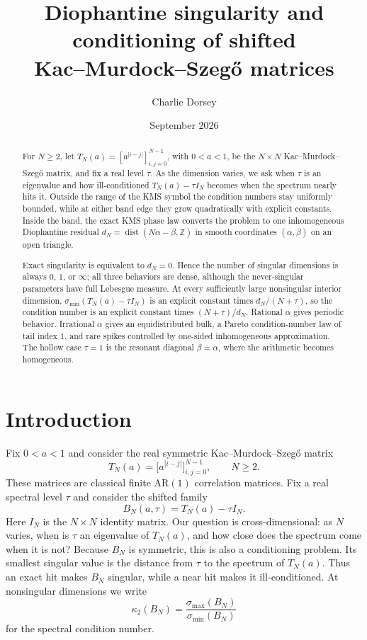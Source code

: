 \documentclass[11pt,reqno]{amsart}
\title[Diophantine singularity of shifted KMS matrices]
{Diophantine singularity and conditioning of shifted\\
Kac--Murdock--Szeg\H{o} matrices}
\author{Charlie Dorsey}
\date{September 2026}
\theoremstyle{plain}
\theoremstyle{definition}
\begin{document}
\begin{abstract}
For $N\ge2$, let $T_N(a)=[a^{|i-j|}]_{i,j=0}^{N-1}$, with $0<a<1$, be the
$N\times N$ Kac--Murdock--Szeg\H{o} matrix, and fix a real level $\tau$.
As the dimension varies, we ask when $\tau$ is an eigenvalue and how ill-conditioned
$T_N(a)-\tau I_N$ becomes when the spectrum nearly hits it.  Outside the range of
the KMS symbol the condition numbers stay uniformly bounded, while at either band
edge they grow quadratically with explicit constants.  Inside the band, the exact
KMS phase law converts the problem to one inhomogeneous Diophantine residual
$d_N=\operatorname{dist}(N\alpha-\beta,\mathbb Z)$ in smooth coordinates
$(\alpha,\beta)$ on an open triangle.

Exact singularity is equivalent to $d_N=0$.  Hence the number of singular
dimensions is always $0$, $1$, or $\infty$; all three behaviors are dense, although
the never-singular parameters have full Lebesgue measure.  At every sufficiently
large nonsingular interior dimension,
$\sigma_{\min}(T_N(a)-\tau I_N)$ is an explicit constant times $d_N/(N+\tau)$,
so the condition number is an explicit constant times $(N+\tau)/d_N$.
Rational $\alpha$ gives periodic behavior.  Irrational $\alpha$ gives an
equidistributed bulk, a Pareto condition-number law of tail index $1$, and rare
spikes controlled by one-sided inhomogeneous approximation.  The hollow case
$\tau=1$ is the resonant diagonal $\beta=\alpha$, where the arithmetic becomes
homogeneous.
\end{abstract}

\maketitle

\section{Introduction}\label{sec:intro}

Fix $0<a<1$ and consider the real symmetric Kac--Murdock--Szeg\H{o} matrix
\begin{equation}\label{eq:Tdef}
T_N(a)=\bigl[a^{|i-j|}\bigr]_{i,j=0}^{N-1},\qquad N\ge2.
\end{equation}
These matrices are classical finite AR$(1)$ correlation matrices.  Fix a real
spectral level $\tau$ and consider the shifted family
\begin{equation}\label{eq:Bdef}
B_N(a,\tau)=T_N(a)-\tau I_N.
\end{equation}
Here $I_N$ is the $N\times N$ identity matrix.  Our question is cross-dimensional: as $N$ varies, when is $\tau$ an eigenvalue of
$T_N(a)$, and how close does the spectrum come when it is not?  Because $B_N$ is
symmetric, this is also a conditioning problem.  Its smallest singular value is the
distance from $\tau$ to the spectrum of $T_N(a)$.  Thus an exact hit makes $B_N$
singular, while a near hit makes it ill-conditioned.  At nonsingular dimensions we
write
\[
\kappa_2(B_N)=\frac{\sigma_{\max}(B_N)}{\sigma_{\min}(B_N)}
\]
for the spectral condition number.
\end{document}
